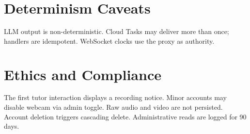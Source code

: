 \section{Determinism Caveats}
\label{sec:determinism}

LLM output is non-deterministic. Cloud Tasks may deliver more than once; handlers are idempotent. WebSocket clocks use the proxy as authority.

\section{Ethics and Compliance}
\label{sec:ethics}

The first tutor interaction displays a recording notice. Minor accounts may disable webcam via admin toggle. Raw audio and video are not persisted. Account deletion triggers cascading delete. Administrative reads are logged for 90 days.
